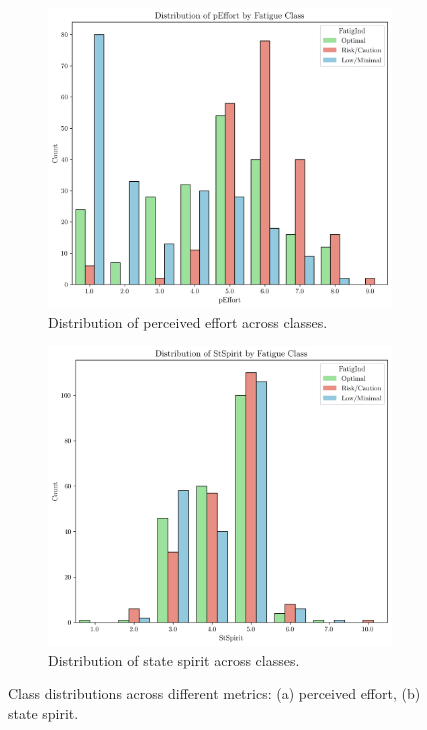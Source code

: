 \documentclass[conference]{IEEEtran}
\begin{document}
\begin{figure}[H]
    \centering
    \begin{subfigure}[1]{\linewidth}
        \centering
        \includegraphics[width=\linewidth]{assets/distribution_pEffort.png}
        \caption{Distribution of perceived effort across classes.}
        \label{fig:subfig-a}
    \end{subfigure}
    
    \vspace{0.5cm}

    \begin{subfigure}[2]{\linewidth}
        \centering
        \includegraphics[width=\linewidth]{assets/distribution_StSpirit.png}
        \caption{Distribution of state spirit across classes.}
        \label{fig:subfig-b}
    \end{subfigure}
    
    \caption{Class distributions across different metrics: (a) perceived effort, (b) state spirit.}
    \label{classdist_feat}
\end{figure}
\end{document}

